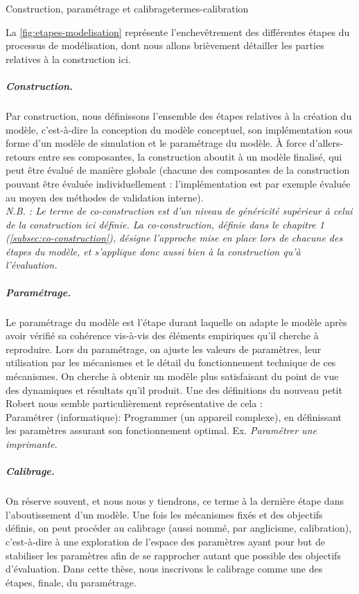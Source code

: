 \begin{encadre}{Construction, paramétrage et calibrage}{termes-calibration}
\renewcommand{\thempfootnote}{\alph{mpfootnote}}
	
La \cref{fig:etapes-modelisation} représente l'enchevêtrement des différentes étapes du processus de modélisation, dont nous allons brièvement détailler les parties relatives à la construction ici.
	
\subparagraph{Construction.}
Par construction, nous définissons l'ensemble des étapes relatives à la création du modèle, c'est-à-dire la conception du modèle conceptuel, son implémentation sous forme d'un modèle de simulation et le paramétrage du modèle.
À force d'allers-retours entre ses composantes, la construction aboutit à un modèle \og finalisé\fg{}, qui peut être évalué de manière globale (chacune des composantes de la construction pouvant être évaluée individuellement : l'implémentation est par exemple évaluée au moyen des méthodes de validation interne).\\
\textit{N.B. : Le terme de co-construction est d'un niveau de généricité supérieur à celui de la construction ici définie.
La co-construction, définie dans le chapitre 1 (\cref{subsec:co-construction}), désigne l'approche mise en place lors de chacune des étapes du modèle, et s'applique donc aussi bien à la construction qu'à l'évaluation.}
		
\subparagraph{Paramétrage.}
Le paramétrage du modèle est l'étape durant laquelle on adapte le modèle après avoir vérifié sa cohérence vis-à-vis des éléments empiriques qu'il cherche à reproduire.
Lors du paramétrage, on ajuste les valeurs de paramètres, leur utilisation par les mécanismes et le détail du fonctionnement technique de ces mécanismes.
On cherche à obtenir un modèle plus satisfaisant du point de vue des dynamiques et résultats qu'il produit.
Une des définitions du nouveau petit Robert \autocite{robert_nouveau_1993} nous semble particulièrement représentative de cela :\\
\og Paramétrer (informatique): \og Programmer (un appareil complexe), en définissant les paramètres assurant son fonctionnement optimal.
Ex. \textit{Paramétrer une imprimante}\fg{}.
		
\subparagraph{Calibrage.}
On réserve souvent, et nous nous y tiendrons, ce terme à la dernière étape dans l'aboutissement d'un modèle.
Une fois les mécanismes fixés et des objectifs définis, on peut procéder au calibrage (aussi nommé, par anglicisme, \og calibration\fg{}), c'est-à-dire à une exploration de l'espace des paramètres ayant pour but de stabiliser les paramètres afin de se rapprocher autant que possible des objectifs d'évaluation.
Dans cette thèse, nous inscrivons le calibrage comme une des étapes, finale, du paramétrage.


\end{encadre}
